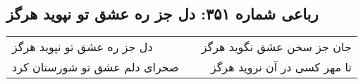 \begin{center}
\section*{رباعی شماره ۳۵۱: دل جز ره عشق تو نپوید هرگز}
\label{sec:sh351}
\begin{longtable}{l p{0.5cm} r}
دل جز ره عشق تو نپوید هرگز
&&
جان جز سخن عشق نگوید هرگز
\\
صحرای دلم عشق تو شورستان کرد
&&
تا مهر کسی در آن نروید هرگز
\\
\end{longtable}
\end{center}
